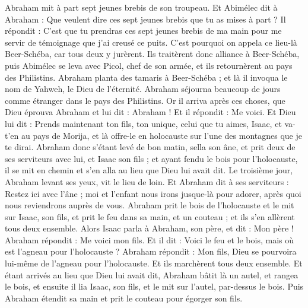 \begin{multicols}{2}
Abraham mit à part sept jeunes brebis de son troupeau.
Et Abimélec dit à Abraham : Que veulent dire ces sept jeunes brebis que tu as mises à part ?
Il répondit : C'est que tu prendras ces sept jeunes brebis de ma main pour me servir de témoignage que j'ai creusé ce puits.
C'est pourquoi on appela ce lieu-là Beer-Schéba, car tous deux y jurèrent.
Ils traitèrent donc alliance à Beer-Schéba, puis Abimélec se leva avec Picol, chef de son armée, et ils retournèrent au pays des Philistins.
Abraham planta des tamaris à Beer-Schéba ; et là il invoqua le nom de Yahweh, le Dieu de l'éternité.
Abraham séjourna beaucoup de jours comme étranger dans le pays des Philistins.
\VerseOne{}Or il arriva après ces choses, que Dieu éprouva Abraham et lui dit : Abraham ! Et il répondit : Me voici.
Et Dieu lui dit : Prends maintenant ton fils, ton unique, celui que tu aimes, Isaac, et va-t'en au pays de Morija, et là offre-le en holocauste sur l'une des montagnes que je te dirai.
Abraham donc s'étant levé de bon matin, sella son âne, et prit deux de ses serviteurs avec lui, et Isaac son fils ; et ayant fendu le bois pour l'holocauste, il se mit en chemin et s'en alla au lieu que Dieu lui avait dit.
Le troisième jour, Abraham levant ses yeux, vit le lieu de loin.
Et Abraham dit à ses serviteurs : Restez ici avec l'âne ; moi et l'enfant nous irons jusque-là pour adorer, après quoi nous reviendrons auprès de vous.
Abraham prit le bois de l'holocauste et le mit sur Isaac, son fils, et prit le feu dans sa main, et un couteau ; et ils s'en allèrent tous deux ensemble.
Alors Isaac parla à Abraham, son père, et dit : Mon père ! Abraham répondit : Me voici mon fils. Et il dit : Voici le feu et le bois, mais où est l'agneau pour l'holocauste ?
Abraham répondit : Mon fils, Dieu se pourvoira lui-même de l'agneau pour l'holocauste. Et ils marchèrent tous deux ensemble.
Et étant arrivés au lieu que Dieu lui avait dit, Abraham bâtit là un autel, et rangea le bois, et ensuite il lia Isaac, son fils, et le mit sur l'autel, par-dessus le bois.
Puis Abraham étendit sa main et prit le couteau pour égorger son fils.

\end{multicols}
